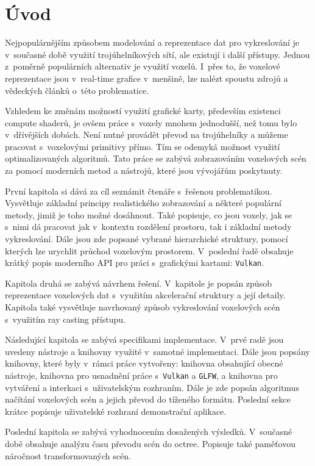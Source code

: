 \chapter{Úvod}
\label{uvod}
Nejpopulárnějším způsobem modelování a reprezentace dat pro vykreslování je v~současné době využití trojúhelníkových sítí, ale existují i další přístupy. Jednou z~poměrně populárních alternativ je využití voxelů. I~přes to, že voxelové reprezentace jsou v~real-time grafice v~menšině, lze nalézt spoustu zdrojů a vědeckých článků o~této problematice.

Vzhledem ke změnám možností využití grafické karty, především existenci compute shaderů, je ovšem práce s~voxely mnohem jednodušší, než tomu bylo v~dřívějších dobách. Není nutné provádět převod na trojúhelníky a můžeme pracovat s~voxelovými primitivy přímo. Tím se odemyká možnost využití optimalizovaných algoritmů. Tato práce se zabývá zobrazováním voxelových scén za pomocí moderních metod a nástrojů, které jsou vývojářům poskytnuty.

První kapitola si dává za cíl seznámit čtenáře s~řešenou problematikou. Vysvětluje základní principy realistického zobrazování a některé populární metody, jimiž je toho možné dosáhnout. Také popisuje, co jsou voxely, jak se s~nimi dá pracovat jak v~kontextu rozdělení prostoru, tak i základní metody vykreslování. Dále jsou zde popsané vybrané hierarchické struktury, pomocí kterých lze urychlit průchod voxelovým prostorem. V~poslední řadě obsahuje krátký popis moderního API pro práci s~grafickými kartami: \texttt{Vulkan}.

Kapitola druhá se zabývá návrhem řešení. V~kapitole je popsán způsob reprezentace voxelových dat s~využitím akcelerační struktury a její detaily. Kapitola také vysvětluje navrhovaný způsob vykreslování voxelových scén s~využitím ray casting přístupu.

Následující kapitola se zabývá specifikami implementace. V~prvé radě jsou uvedeny nástroje a knihovny využité v~samotné implementaci. Dále jsou popsány knihovny, které byly v~rámci práce vytvořeny: knihovna obsahující obecné nástroje, knihovna pro usnadnění práce s~\texttt{Vulkan} a \texttt{GLFW}, a knihovna pro vytváření a interkaci s~uživatelským rozhraním. Dále je zde popsán algoritmus načítání voxelových scén a jejich převod do tíženého formátu. Poslední sekce krátce popisuje uživatelské rozhraní demonstrační aplikace.

Poslední kapitola se zabývá vyhodnocením dosažených výsledků. V~současné době obsahuje analýzu času převodu scén do octree. Popisuje také paměťovou náročnost transformovaných scén.

